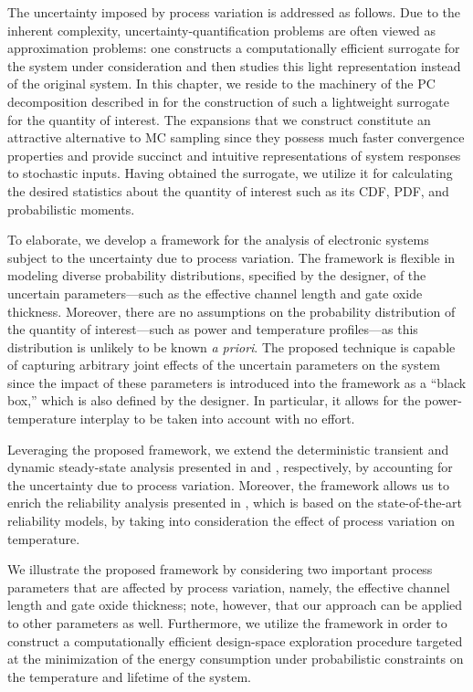 The uncertainty imposed by process variation is addressed as follows. Due to the
inherent complexity, uncertainty-quantification problems are often viewed as
approximation problems: one constructs a computationally efficient surrogate for
the system under consideration and then studies this light representation
instead of the original system. In this chapter, we reside to the machinery of
the \acf{PC} decomposition described in  for the
construction of such a lightweight surrogate for the quantity of interest. The
expansions that we construct constitute an attractive alternative to \ac{MC}
sampling since they possess much faster convergence properties and provide
succinct and intuitive representations of system responses to stochastic inputs.
Having obtained the surrogate, we utilize it for calculating the desired
statistics about the quantity of interest such as its \acf{CDF}, \acf{PDF}, and
probabilistic moments.

To elaborate, we develop a framework for the analysis of electronic systems
subject to the uncertainty due to process variation. The framework is flexible
in modeling diverse probability distributions, specified by the designer, of the
uncertain parameters---such as the effective channel length and gate oxide
thickness. Moreover, there are no assumptions on the probability distribution of
the quantity of interest---such as power and temperature profiles---as this
distribution is unlikely to be known \emph{a priori}. The proposed technique is
capable of capturing arbitrary joint effects of the uncertain parameters on the
system since the impact of these parameters is introduced into the framework as
a ``black box,'' which is also defined by the designer. In particular, it allows
for the power-temperature interplay to be taken into account with no effort.

Leveraging the proposed framework, we extend the deterministic transient and
dynamic steady-state analysis presented in  and
, respectively, by accounting for the
uncertainty due to process variation. Moreover, the framework allows us to
enrich the reliability analysis presented in , which
is based on the state-of-the-art reliability models, by taking into
consideration the effect of process variation on temperature.

We illustrate the proposed framework by considering two important process
parameters that are affected by process variation, namely, the effective channel
length and gate oxide thickness; note, however, that our approach can be applied
to other parameters as well. Furthermore, we utilize the framework in order to
construct a computationally efficient design-space exploration procedure
targeted at the minimization of the energy consumption under probabilistic
constraints on the temperature and lifetime of the system.
